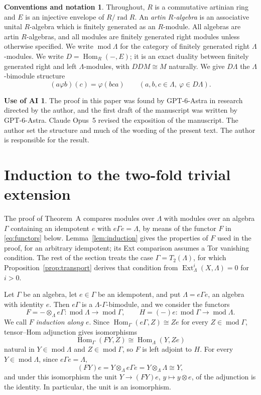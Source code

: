 \documentclass[a4paper,reqno,10pt]{amsart}
\theoremstyle{definition}
\newtheorem*{conventions}{Conventions and notation}
\newtheorem*{aiuse}{Use of AI}
\numberwithin{equation}{section}
\newcommand{\Hom}{\operatorname{Hom}}
\newcommand{\Ext}{\operatorname{Ext}}
\newcommand{\rad}{\operatorname{rad}}
\newcommand{\modu}{\operatorname{mod}}
\begin{document}
\begin{conventions}
Throughout, $R$ is a commutative artinian ring and $E$ is an injective
envelope of $R/\rad R$.  An \emph{artin $R$-algebra} is an associative unital
$R$-algebra which is finitely generated as an $R$-module.  All algebras are
artin $R$-algebras, and all modules are finitely generated right modules
unless otherwise specified.  We write $\modu\Lambda$ for the category of
finitely generated right $\Lambda$-modules.  We write $D=\Hom_R(-,E)$; it is an exact duality between finitely
generated right and left $\Lambda$-modules, with $DDM\cong M$ naturally.  We give $D\Lambda$ the $\Lambda$-bimodule
structure
\[
 (a\varphi b)(c)=\varphi(bca)\qquad(a,b,c\in\Lambda,\ \varphi\in D\Lambda).
\]
\end{conventions}

\begin{aiuse}
The proof in this paper was found by GPT-6-Astra in research directed by the
author, and the first draft of the manuscript was written by GPT-6-Astra.
Claude Opus~5 revised the exposition of the manuscript.  The author set the
structure and much of the wording of the present text.  The author is
responsible for the result.
\end{aiuse}

\section{Induction to the two-fold trivial extension}
\label{sec:induction}

The proof of Theorem~A compares modules over $\Lambda$ with modules over an
algebra $\Gamma$ containing an idempotent $e$ with $e\Gamma e=\Lambda$, by
means of the functor $F$ in \eqref{eq:functors} below.
Lemma~\ref{lem:induction} gives the properties of $F$ used in the proof, for
an arbitrary idempotent; its Ext comparison assumes a Tor vanishing
condition.  The rest of the section treats the case $\Gamma=T_2(\Lambda)$, for
which Proposition~\ref{prop:transport} derives that condition from
$\Ext_\Lambda^i(X,\Lambda)=0$ for $i>0$.

Let $\Gamma$ be an algebra, let $e\in\Gamma$ be an idempotent, and put
$\Lambda=e\Gamma e$, an algebra with identity $e$.  Then $e\Gamma$ is a
$\Lambda$-$\Gamma$-bimodule, and we consider the functors
\begin{equation}\label{eq:functors}
 F=-\otimes_\Lambda e\Gamma\colon\modu\Lambda\longrightarrow\modu\Gamma,
 \qquad
 H=(-)e\colon\modu\Gamma\longrightarrow\modu\Lambda.
\end{equation}
We call $F$ \emph{induction along $e$}.  Since $\Hom_\Gamma(e\Gamma,Z)\cong
Ze$ for every $Z\in\modu\Gamma$, tensor--Hom adjunction gives isomorphisms
\begin{equation}\label{eq:adjunction}
 \Hom_\Gamma(FY,Z)\cong\Hom_\Lambda(Y,Ze)
\end{equation}
natural in $Y\in\modu\Lambda$ and $Z\in\modu\Gamma$, so $F$ is left adjoint
to $H$.  For every $Y\in\modu\Lambda$, since $e\Gamma e=\Lambda$,
\[
 (FY)e=Y\otimes_\Lambda e\Gamma e=Y\otimes_\Lambda\Lambda\cong Y,
\]
and under this isomorphism the unit $Y\to(FY)e$, $y\mapsto y\otimes e$, of the
adjunction is the identity.  In particular, the unit is an isomorphism.
\end{document}
